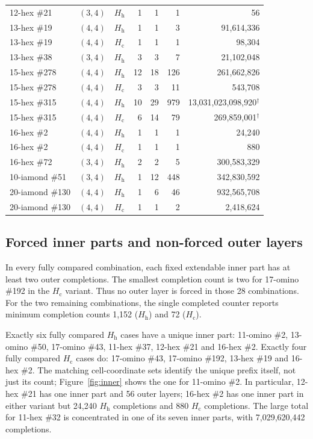 \documentclass[10pt,a4paper]{article}
\theoremstyle{definition}
\theoremstyle{remark}
\newcommand{\Hc}{H_{\mathrm c}}
\newcommand{\Hh}{H_{\mathrm h}}
\begin{document}
{\begin{longtable}{@{}llcrrrr@{}}
12-hex \#21 & $(3,4)$ & $\Hh$ & 1 & 1 & 1 & 56\\
13-hex \#19 & $(4,4)$ & $\Hh$ & 1 & 1 & 3 & 91,614,336\\
13-hex \#19 & $(4,4)$ & $\Hc$ & 1 & 1 & 1 & 98,304\\
13-hex \#38 & $(3,4)$ & $\Hh$ & 3 & 3 & 7 & 21,102,048\\
15-hex \#278 & $(4,4)$ & $\Hh$ & 12 & 18 & 126 & 261,662,826\\
15-hex \#278 & $(4,4)$ & $\Hc$ & 3 & 3 & 11 & 543,708\\
15-hex \#315 & $(4,4)$ & $\Hh$ & 10 & 29 & 979 & 13,031,023,098,920$^{\dagger}$\\
15-hex \#315 & $(4,4)$ & $\Hc$ & 6 & 14 & 79 & 269,859,001$^{\dagger}$\\
16-hex \#2 & $(4,4)$ & $\Hh$ & 1 & 1 & 1 & 24,240\\
16-hex \#2 & $(4,4)$ & $\Hc$ & 1 & 1 & 1 & 880\\
16-hex \#72 & $(3,4)$ & $\Hh$ & 2 & 2 & 5 & 300,583,329\\
10-iamond \#51 & $(3,4)$ & $\Hh$ & 1 & 12 & 448 & 342,830,592\\
20-iamond \#130 & $(4,4)$ & $\Hh$ & 1 & 6 & 46 & 932,565,708\\
20-iamond \#130 & $(4,4)$ & $\Hc$ & 1 & 1 & 2 & 2,418,624\\
\end{longtable}}

\subsection{Forced inner parts and non-forced outer layers}
In every fully compared combination, each fixed extendable inner part
has at least two outer completions. The smallest completion count is two
for 17-omino \#192 in the $\Hc$ variant. Thus no outer layer is forced
in those 28 combinations. For the two remaining combinations, the
single completed counter reports minimum completion counts 1,152
($\Hh$) and 72 ($\Hc$).

Exactly six fully compared $\Hh$ cases have a unique inner part:
11-omino \#2, 13-omino \#50, 17-omino \#43, 11-hex \#37,
12-hex \#21 and 16-hex \#2. Exactly four fully compared $\Hc$ cases do:
17-omino \#43, 17-omino \#192, 13-hex \#19 and 16-hex \#2.
The matching cell-coordinate sets identify the unique prefix itself,
not just its count; Figure~\ref{fig:inner} shows the one for 11-omino
\#2. In particular, 12-hex \#21 has one inner part and
56 outer layers; 16-hex \#2 has one inner part in either variant but
24,240 $\Hh$ completions and 880 $\Hc$ completions. The large total for
11-hex \#32 is concentrated in one of its seven inner parts, with
7,029,620,442 completions.
\end{document}
